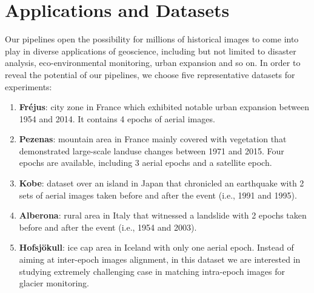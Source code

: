 
\chapter{Applications and Datasets}
\label{chap:ApplicationsAndDatasets}
Our pipelines open the possibility for millions of historical images to come into play in diverse applications of geoscience, including but not limited to disaster analysis, eco-environmental monitoring, urban expansion and so on. 
In order to reveal the potential of our pipelines, we choose five representative datasets for experiments:\\
\begin{enumerate}
	\item \textbf{Fr{\'e}jus}: city zone in France which exhibited notable urban expansion between 1954 and 2014. It contains 4 epochs of aerial images.
	\item \textbf{Pezenas}: mountain area in France mainly covered with vegetation that demonstrated large-scale landuse changes between 1971 and 2015. Four epochs are available, including 3 aerial epochs and a satellite epoch.
	\item \textbf{Kobe}: dataset over an island in Japan that chronicled an earthquake with 2 sets of aerial images taken before and after the event (i.e., 1991 and 1995).
	\item \textbf{Alberona}: rural area in Italy that witnessed a landslide with 2 epochs taken before and after the event (i.e., 1954 and 2003).
	\item \textbf{Hofsjökull}: ice cap area in Iceland with only one aerial epoch. Instead of aiming at inter-epoch images alignment, in this dataset we are interested in studying extremely challenging case in matching intra-epoch images for glacier monitoring.
\end{enumerate}


%

